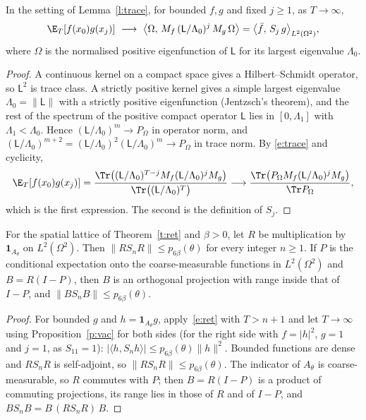 \begin{proposition}\label{p:vac}
In the setting of Lemma~\ref{l:trace}, for bounded $f,g$ and fixed $j\ge1$, as $T\to\infty$,
\[
\E_T[f(x_0)g(x_j)]\ \longrightarrow\ \big\langle\Omega,\,M_f\,(\mathsf L/\Lambda_0)^j\,M_g\,\Omega\big\rangle
=\big\langle\bar f,\,S_j\,g\big\rangle_{L^2(\Omega^2)} ,
\]
where $\Omega$ is the normalised positive eigenfunction of $\mathsf L$ for its largest eigenvalue $\Lambda_0$.
\end{proposition}
\begin{proof}
A continuous kernel on a compact space gives a Hilbert--Schmidt operator, so $\mathsf L^2$ is trace class.
A strictly positive kernel gives a simple largest eigenvalue $\Lambda_0=\|\mathsf L\|$ with a strictly positive
eigenfunction (Jentzsch's theorem), and the rest of the spectrum of the positive compact operator $\mathsf L$
lies in $[0,\Lambda_1]$ with $\Lambda_1<\Lambda_0$. Hence $(\mathsf L/\Lambda_0)^m\to P_\Omega$ in operator norm,
and $(\mathsf L/\Lambda_0)^{m+2}=(\mathsf L/\Lambda_0)^2(\mathsf L/\Lambda_0)^m\to P_\Omega$ in trace norm. By
\eqref{e:trace} and cyclicity,
\[
\E_T[f(x_0)g(x_j)]=\frac{\Tr\big((\mathsf L/\Lambda_0)^{T-j}M_f(\mathsf L/\Lambda_0)^jM_g\big)}{\Tr\big((\mathsf L/\Lambda_0)^T\big)}
\longrightarrow\frac{\Tr\big(P_\Omega M_f(\mathsf L/\Lambda_0)^jM_g\big)}{\Tr P_\Omega},
\]
which is the first expression. The second is the definition of $S_j$.
\end{proof}

\begin{corollary}\label{c:vac}
For the spatial lattice of Theorem~\ref{t:ret} and $\beta>0$, let $R$ be
multiplication by $\mathbf 1_{A_\theta}$ on $L^2(\Omega^2)$. Then $\|RS_nR\|\le p_{6\beta}(\theta)$ for every
integer $n\ge1$. If $P$ is the conditional expectation onto the coarse-measurable functions in
$L^2(\Omega^2)$ and $B=R(I-P)$, then $B$ is an orthogonal projection with range inside that of $I-P$, and
$\|BS_nB\|\le p_{6\beta}(\theta)$.
\end{corollary}
\begin{proof}
For bounded $g$ and $h=\mathbf 1_{A_\theta}g$, apply~\eqref{e:ret} with $T>n+1$ and let $T\to\infty$ using
Proposition~\ref{p:vac} for both sides (for the right side with $f=|h|^2$, $g=1$ and $j=1$, as $S_11=1$): $|\langle h,S_nh\rangle|\le p_{6\beta}(\theta)\|h\|^2$. Bounded functions
are dense and $RS_nR$ is self-adjoint, so $\|RS_nR\|\le p_{6\beta}(\theta)$. The indicator of $A_\theta$ is
coarse-measurable, so $R$ commutes with $P$; then $B=R(I-P)$ is a product of commuting projections, its range
lies in those of $R$ and of $I-P$, and $BS_nB=B\,(RS_nR)\,B$.
\end{proof}

